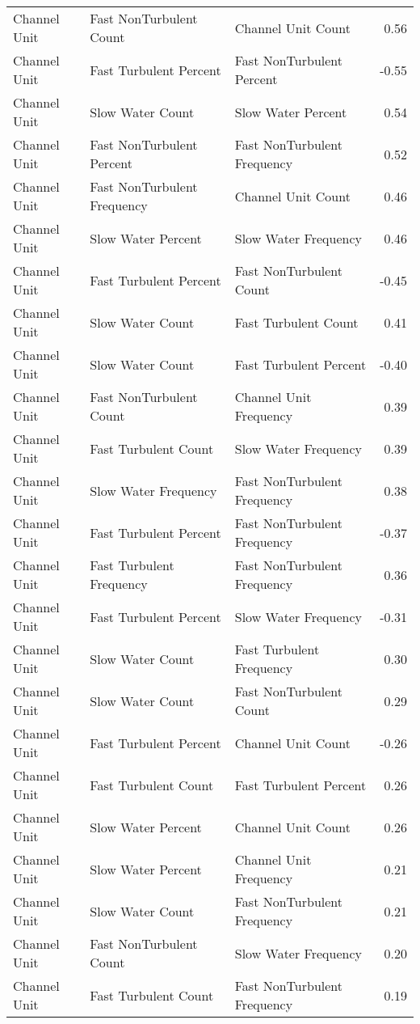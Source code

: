 \documentclass[
  12pt,
]{article}
\begin{document}
\begin{longtable}[t]{>{\raggedright\arraybackslash}p{1in}>{\raggedright\arraybackslash}p{2in}>{\raggedright\arraybackslash}p{2in}r}
Channel Unit & Fast NonTurbulent Count & Channel Unit Count & 0.56\\
Channel Unit & Fast Turbulent Percent & Fast NonTurbulent Percent & -0.55\\
Channel Unit & Slow Water Count & Slow Water Percent & 0.54\\
Channel Unit & Fast NonTurbulent Percent & Fast NonTurbulent Frequency & 0.52\\
\addlinespace
Channel Unit & Fast NonTurbulent Frequency & Channel Unit Count & 0.46\\
Channel Unit & Slow Water Percent & Slow Water Frequency & 0.46\\
Channel Unit & Fast Turbulent Percent & Fast NonTurbulent Count & -0.45\\
Channel Unit & Slow Water Count & Fast Turbulent Count & 0.41\\
Channel Unit & Slow Water Count & Fast Turbulent Percent & -0.40\\
\addlinespace
Channel Unit & Fast NonTurbulent Count & Channel Unit Frequency & 0.39\\
Channel Unit & Fast Turbulent Count & Slow Water Frequency & 0.39\\
Channel Unit & Slow Water Frequency & Fast NonTurbulent Frequency & 0.38\\
Channel Unit & Fast Turbulent Percent & Fast NonTurbulent Frequency & -0.37\\
Channel Unit & Fast Turbulent Frequency & Fast NonTurbulent Frequency & 0.36\\
\addlinespace
Channel Unit & Fast Turbulent Percent & Slow Water Frequency & -0.31\\
Channel Unit & Slow Water Count & Fast Turbulent Frequency & 0.30\\
Channel Unit & Slow Water Count & Fast NonTurbulent Count & 0.29\\
Channel Unit & Fast Turbulent Percent & Channel Unit Count & -0.26\\
Channel Unit & Fast Turbulent Count & Fast Turbulent Percent & 0.26\\
\addlinespace
Channel Unit & Slow Water Percent & Channel Unit Count & 0.26\\
Channel Unit & Slow Water Percent & Channel Unit Frequency & 0.21\\
Channel Unit & Slow Water Count & Fast NonTurbulent Frequency & 0.21\\
Channel Unit & Fast NonTurbulent Count & Slow Water Frequency & 0.20\\
Channel Unit & Fast Turbulent Count & Fast NonTurbulent Frequency & 0.19\\

\end{longtable}
\end{document}
